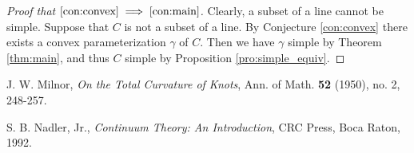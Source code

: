 \documentclass{amsart}
\theoremstyle{definition}
\theoremstyle{remark}
\begin{document}
\begin{proof}[Proof that $\ref{con:convex}\implies\ref{con:main}$]
    Clearly, a subset of a line cannot be simple.
    Suppose that $C$ is not a subset of a line. By Conjecture
    \ref{con:convex} there exists a convex parameterization
    $\gamma$ of $C$. Then we have $\gamma$ simple by
    Theorem \ref{thm:main}, and thus $C$ simple by
    Proposition \ref{pro:simple_equiv}.
\end{proof}

\begin{thebibliography}{9}

    J. W. Milnor,
    \emph{On the Total Curvature of Knots},
    Ann. of Math.
    \textbf{52} (1950), no. 2, 248-257.

    S. B. Nadler, Jr.,
    \emph{Continuum Theory: An Introduction},
    CRC Press, Boca Raton, 1992.

\end{thebibliography}
\end{document}
